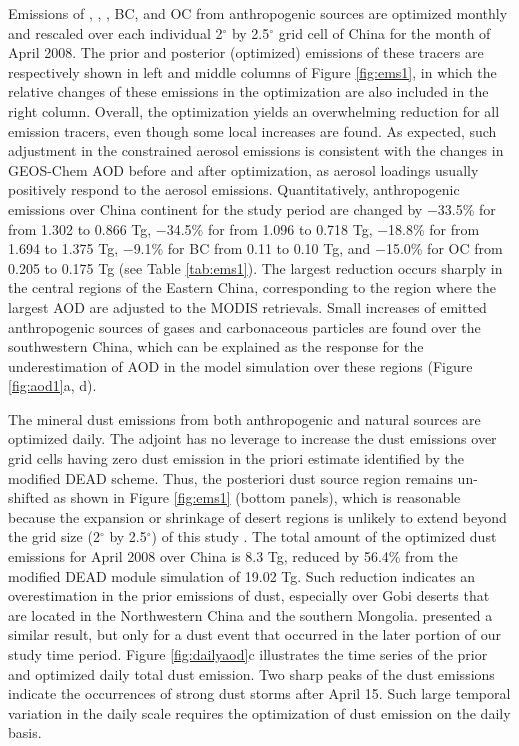  Emissions of , , , BC, and OC from anthropogenic sources
 are optimized monthly and rescaled over each individual
 2$^{\circ}$ by 2.5$^{\circ}$ grid cell of China for the month of April 2008.
 The prior and posterior (optimized) emissions of these tracers
 are respectively shown in left and middle columns of Figure \ref{fig:ems1},
 in which the relative changes of these emissions in the optimization
 are also included in the right column. Overall, the optimization yields
 an overwhelming reduction for all emission tracers,
 even though some local increases are found.
 As expected, such adjustment in the constrained aerosol emissions
 is consistent with the changes in GEOS-Chem AOD before and after optimization,
 as aerosol loadings usually positively respond to the aerosol emissions.
 Quantitatively, anthropogenic emissions over China continent for the study period
 are changed by $-$33.5\% for  from 1.302 to 0.866 Tg, $-$34.5\% for  from 1.096 to 0.718 Tg,
 $-$18.8\% for  from 1.694 to 1.375 Tg, $-$9.1\% for BC from 0.11 to 0.10 Tg,
 and $-$15.0\% for OC from 0.205 to 0.175 Tg (see Table \ref{tab:ems1}).
 The largest reduction occurs sharply in the central regions of the Eastern China,
 corresponding to the region where the largest AOD are adjusted to the MODIS retrievals.
 Small increases of emitted anthropogenic sources of gases and carbonaceous particles
 are found over the southwestern China, which can be explained
 as the response for the underestimation of AOD in the model simulation over these regions
 (Figure \ref{fig:aod1}a, d). 

 The mineral dust emissions from both anthropogenic and natural sources are optimized daily.
 The adjoint has no leverage to increase the dust emissions over grid cells
 having zero dust emission in the priori estimate identified by the modified DEAD scheme.
 Thus, the posteriori dust source region remains un-shifted as shown
 in Figure \ref{fig:ems1} (bottom panels), which is reasonable
 because the expansion or shrinkage of desert regions is unlikely to extend beyond
 the grid size (2$^{\circ}$ by 2.5$^{\circ}$) of this study \citep{Zender03a,Fairlie07}.
 The total amount of the optimized dust emissions for April 2008 over China is 8.3 Tg,
 reduced by 56.4\% from the modified DEAD module simulation of 19.02 Tg.
 Such reduction indicates an overestimation in the prior emissions of dust,
 especially over Gobi deserts that are located in the Northwestern China and the southern Mongolia.
 \citet{Wang12} presented a similar result,
 but only for a dust event that occurred in the later portion of our study time period.
 Figure \ref{fig:dailyaod}c illustrates the time series of the prior and optimized
 daily total dust emission.
 Two sharp peaks of the dust emissions indicate the occurrences of strong dust storms
 after April 15. Such large temporal variation in the daily scale
 requires the optimization of dust emission on the daily basis. 

